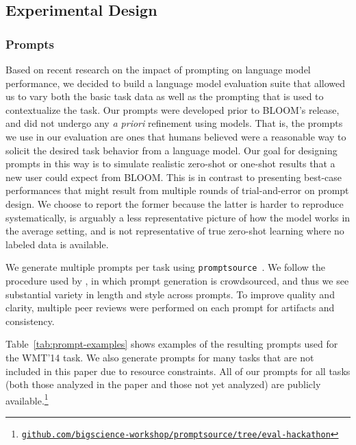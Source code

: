 \documentclass[twoside,11pt]{article}
\begin{document}
\subsection{Experimental Design}
\label{sec:eval:design}

\subsubsection{Prompts} Based on recent research on the impact of prompting on language model performance, we decided to build a language model evaluation suite that allowed us to vary both the basic task data as well as the prompting that is used to contextualize the task. Our prompts were developed prior to BLOOM's release, and did not undergo any \textit{a priori} refinement using models. That is, the prompts we use in our evaluation are ones that humans believed were a reasonable way to solicit the desired task behavior from a language model. Our goal for designing prompts in this way is to simulate realistic zero-shot or one-shot results that a new user could expect from BLOOM. This is in contrast to presenting best-case performances that might result from multiple rounds of trial-and-error on prompt design. We choose to report the former because the latter is harder to reproduce systematically, is arguably a less representative picture of how the model works in the average setting, and is not representative of true zero-shot learning where no labeled data is available. 

We generate multiple prompts per task using \texttt{promptsource}~\citep{bach2022promptsource}. We follow the procedure used by \citet{sanh2022multitask}, in which prompt generation is crowdsourced, and thus we see substantial variety in length and style across prompts. To improve quality and clarity, multiple peer reviews were performed on each prompt for artifacts and consistency.

Table~\ref{tab:prompt-examples} shows examples of the resulting prompts used for the WMT'14 task. We also generate prompts for many tasks that are not included in this paper due to resource constraints. All of our prompts for all tasks (both those analyzed in the paper and those not yet analyzed) are publicly available.\footnote{\href{https://github.com/bigscience-workshop/promptsource/tree/eval-hackathon}{\texttt{github.com/bigscience-workshop/promptsource/tree/eval-hackathon}}}
\end{document}
